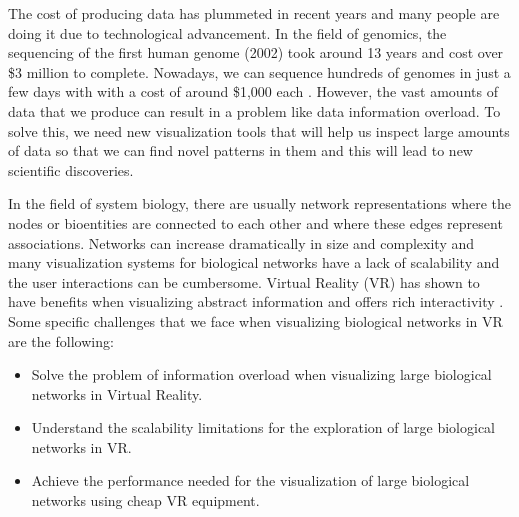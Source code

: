 
The cost of producing data has plummeted in recent years and many people are doing it due to technological advancement. In the field of genomics, the sequencing of the first human genome (2002) took around 13 years and cost over \$3 million to complete. Nowadays, we can sequence hundreds of genomes in just a few days with with a cost of around \$1,000 each \cite{big_biological_impacts_bd}. However, the vast amounts of data that we produce can result in a problem like data information overload. To solve this, we need new visualization tools that will help us inspect large amounts of data so that we can find novel patterns in them and this will lead to new scientific discoveries.



In the field of system biology, there are usually network representations where the nodes or bioentities are connected to each other and where these edges represent associations. Networks can increase dramatically in size and complexity and many visualization systems for biological networks have a lack of scalability and the user interactions can be cumbersome. Virtual Reality (VR) has shown to have benefits when visualizing abstract information and offers rich interactivity \cite{zhang_paciorkowski_craig_cui_2019}. Some specific challenges that we face when visualizing biological networks in VR are the following:
\begin{itemize}
  \item Solve the problem of information overload when visualizing large biological networks in Virtual Reality.
  \item Understand the scalability limitations for the exploration of large biological networks in VR.
  \item Achieve the performance needed for the visualization of large biological networks using cheap VR equipment.
\end{itemize}

